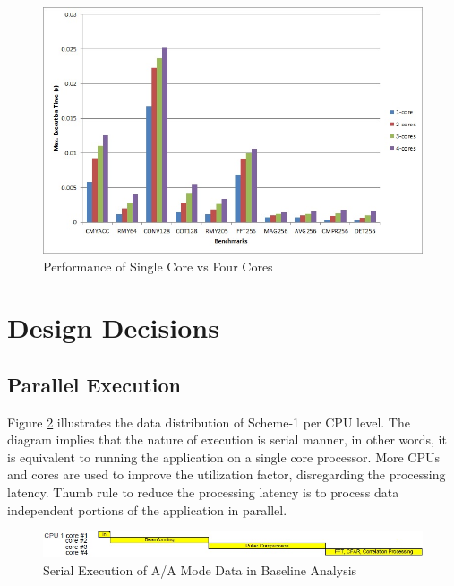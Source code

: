 \begin{figure}[h!]
	\centering
	\includegraphics[width=140mm]{figures/1core_4core}
	\caption{Performance of Single Core vs Four Cores}
	\label{fig:mm:1core_4core}
\end{figure}


\clearpage
\section{Design Decisions}
\label{mm:design_decisions}

\subsection{Parallel Execution}
Figure \ref{fig:mm:aa_serial_exe} illustrates the data distribution of Scheme-1 per CPU level. The diagram implies that the nature of execution is serial manner, in other words, it is equivalent to running the application on a single core processor. More CPUs and cores are used to improve the utilization factor, disregarding the processing latency. Thumb rule to reduce the processing latency is to process data independent portions of the application in parallel. 

\begin{figure}[h!]
	\centering
	\includegraphics[width=160mm]{figures/aa_serial_exe}
	\caption{Serial Execution of A/A Mode Data in Baseline Analysis}
	\label{fig:mm:aa_serial_exe}
\end{figure}

